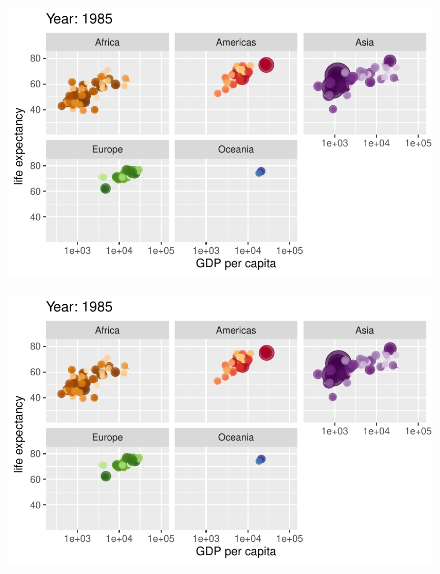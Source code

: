 \documentclass[
  letterpaper,
  DIV=11,
  numbers=noendperiod]{scrartcl}
\begin{document}
\begin{figure}[H]

{\centering \includegraphics{class05_files/figure-pdf/unnamed-chunk-24-60.pdf}

}

\end{figure}

\begin{figure}[H]

{\centering \includegraphics{class05_files/figure-pdf/unnamed-chunk-24-61.pdf}

}

\end{figure}
\end{document}

